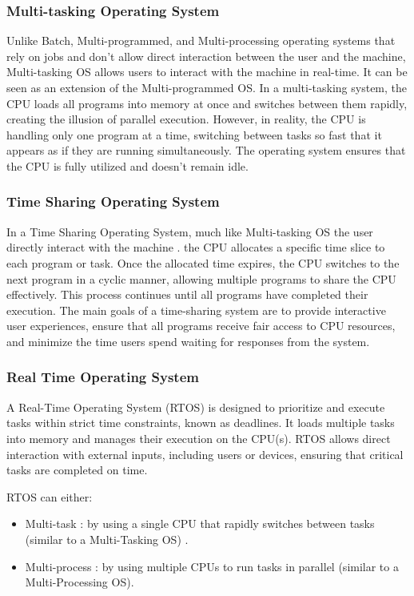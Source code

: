 \subsubsection{Multi-tasking Operating System}
Unlike Batch, Multi-programmed, and Multi-processing operating systems that rely on jobs and don't allow direct interaction between the user and the machine, Multi-tasking OS allows 
users to interact with the machine in real-time. It can be seen as an extension of the Multi-programmed OS. In a multi-tasking system, the CPU loads all programs into memory at once and 
switches between them rapidly, creating the illusion of parallel execution. However, in reality, the CPU is handling only one program at a time, switching between tasks so fast that it appears 
as if they are running simultaneously. The operating system ensures that the CPU is fully utilized and doesn’t remain idle.
\subsubsection{Time Sharing Operating System}
In a Time Sharing Operating System, much like Multi-tasking OS the user directly interact with the machine . the CPU allocates a specific time slice to each program or task. Once the allocated 
time expires, the CPU switches to the next program in a cyclic manner,
allowing multiple programs to share the CPU effectively. This process continues until all programs have completed their execution.
The main goals of a time-sharing system are to provide interactive user experiences, ensure that all programs receive fair access to CPU resources, and minimize the time users spend waiting 
for responses from the system.
\subsubsection{Real Time Operating System}
A Real-Time Operating System (RTOS) is designed to prioritize and execute tasks within strict time constraints, known as deadlines. It loads multiple tasks into memory and manages their execution
on the CPU(s). RTOS allows direct interaction with external inputs, including users or devices, ensuring that critical tasks are completed on time.

RTOS can either:
\begin{itemize}
    \item Multi-task :  by using a single CPU that rapidly switches between tasks (similar to a Multi-Tasking OS) .
    \item Multi-process : by using multiple CPUs to run tasks in parallel (similar to a Multi-Processing OS).
\end{itemize}

